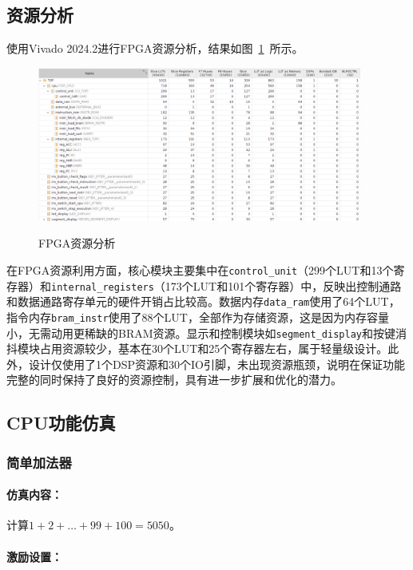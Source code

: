 \documentclass[lang=cn,a4paper,newtx]{elegantpaper}
\begin{document}
\subsection{资源分析}
使用Vivado 2024.2进行FPGA资源分析，结果如图~\ref{tab:resource}~所示。
\begin{figure}[htbp]
  \centering
  \caption{FPGA资源分析}
  \includegraphics[width = 0.95\textwidth]{figure/resource_list.png}
  \label{tab:resource}
\end{figure}

在FPGA资源利用方面，核心模块主要集中在\texttt{control\_unit}（299个LUT和13个寄存器）和\texttt{internal\_registers}（173个LUT和101个寄存器）中，反映出控制通路和数据通路寄存单元的硬件开销占比较高。数据内存\texttt{data\_ram}使用了64个LUT，指令内存\texttt{bram\_instr}使用了88个LUT，全部作为存储资源，这是因为内存容量小，无需动用更稀缺的BRAM资源。显示和控制模块如\texttt{segment\_display}和按键消抖模块占用资源较少，基本在30个LUT和25个寄存器左右，属于轻量级设计。此外，设计仅使用了1个DSP资源和30个IO引脚，未出现资源瓶颈，说明在保证功能完整的同时保持了良好的资源控制，具有进一步扩展和优化的潜力。

\subsection{CPU功能仿真}

\subsubsection{简单加法器}

\paragraph{仿真内容：}

计算$1+2+\dots +99 +100 =5050$。

\paragraph{激励设置：}
\end{document}

